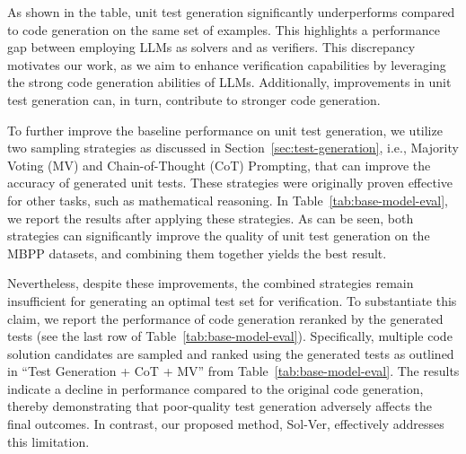 \begin{table}[t]
\caption{Agreement between Iter 1 and Iter 2, and the test accuracy for the model ensemble. The ensemble approach (Ens.) refers to selecting code solutions that successfully pass both the tests generated in the first iteration and those from the second iteration.}
\label{tab:agreement}
\begin{center}
\end{center}
\end{table}

As shown in the table, unit test generation significantly underperforms compared to code generation on the same set of examples. This highlights a performance gap between employing LLMs as solvers and as verifiers. This discrepancy motivates our work, as we aim to enhance verification capabilities by leveraging the strong code generation abilities of LLMs. Additionally, improvements in unit test generation can, in turn, contribute to stronger code generation.

To further improve the baseline performance on unit test generation, we utilize two sampling strategies as discussed in Section~\ref{sec:test-generation}, i.e., Majority Voting (MV) and Chain-of-Thought (CoT) Prompting, that can improve the accuracy of generated unit tests. These strategies were originally proven effective for other tasks, such as mathematical reasoning. In Table~\ref{tab:base-model-eval}, we report the results after applying these strategies. As can be seen, both strategies can significantly improve the quality of unit test generation on the MBPP datasets, and combining them together yields the best result.

Nevertheless, despite these improvements, the combined strategies remain insufficient for generating an optimal test set for verification.
To substantiate this claim, we report the performance of code generation reranked by the generated tests (see the last row of Table~\ref{tab:base-model-eval}). Specifically, multiple code solution candidates are sampled and ranked using the generated tests as outlined in ``Test Generation + CoT + MV'' from Table~\ref{tab:base-model-eval}. The results indicate a decline in performance compared to the original code generation, thereby demonstrating that poor-quality test generation adversely affects the final outcomes. In contrast, our proposed method, {\sc Sol-Ver}, effectively addresses this limitation.


